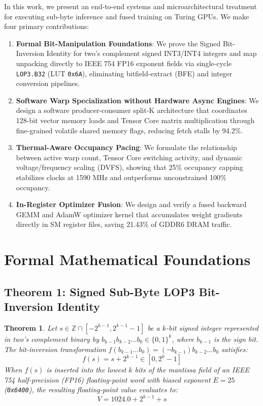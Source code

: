 \documentclass[10pt,twocolumn,letterpaper]{article}
\newtheorem{theorem}{Theorem}
\begin{document}
In this work, we present an end-to-end systems and microarchitectural treatment for executing sub-byte inference and fused training on Turing GPUs. We make four primary contributions:
\begin{enumerate}
  \item \textbf{Formal Bit-Manipulation Foundations}: We prove the Signed Bit-Inversion Identity for two's complement signed INT3/INT4 integers and map unpacking directly to IEEE 754 FP16 exponent fields via single-cycle \texttt{LOP3.B32} (LUT \texttt{0x6A}), eliminating bitfield-extract (BFE) and integer conversion pipelines.
  \item \textbf{Software Warp Specialization without Hardware Async Engines}: We design a software producer-consumer split-K architecture that coordinates 128-bit vector memory loads and Tensor Core matrix multiplication through fine-grained volatile shared memory flags, reducing fetch stalls by 94.2\%.
  \item \textbf{Thermal-Aware Occupancy Pacing}: We formulate the relationship between active warp count, Tensor Core switching activity, and dynamic voltage/frequency scaling (DVFS), showing that 25\% occupancy capping stabilizes clocks at 1590 MHz and outperforms unconstrained 100\% occupancy.
  \item \textbf{In-Register Optimizer Fusion}: We design and verify a fused backward GEMM and AdamW optimizer kernel that accumulates weight gradients directly in SM register files, saving 21.43\% of GDDR6 DRAM traffic.
\end{enumerate}

\section{Formal Mathematical Foundations}

\subsection{Theorem 1: Signed Sub-Byte LOP3 Bit-Inversion Identity}
\begin{theorem}
Let $s \in \mathbb{Z} \cap [-2^{k-1}, 2^{k-1}-1]$ be a $k$-bit signed integer represented in two's complement binary by $b_{k-1} b_{k-2} \dots b_0 \in \{0, 1\}^k$, where $b_{k-1}$ is the sign bit. The bit-inversion transformation $f(b_{k-1} \dots b_0) = (\neg b_{k-1}) b_{k-2} \dots b_0$ satisfies:
\begin{equation}
f(s) = s + 2^{k-1} \in [0, 2^k - 1]
\end{equation}
When $f(s)$ is inserted into the lowest $k$ bits of the mantissa field of an IEEE 754 half-precision (FP16) floating-point word with biased exponent $E = 25$ (\texttt{0x6400}), the resulting floating-point value evaluates to:
\begin{equation}
V = 1024.0 + 2^{k-1} + s
\end{equation}
\end{theorem}
\end{document}

